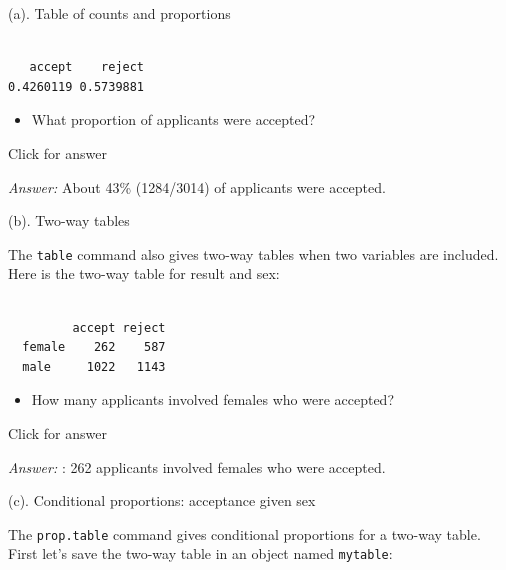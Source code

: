 \documentclass[
]{book}
\newenvironment{Shaded}{\begin{snugshade}}{\end{snugshade}}
\newcommand{\FunctionTok}[1]{\textcolor[rgb]{0.00,0.00,0.00}{#1}}
\newcommand{\NormalTok}[1]{#1}
\newcommand{\SpecialCharTok}[1]{\textcolor[rgb]{0.00,0.00,0.00}{#1}}
\providecommand{\tightlist}{%
  \setlength{\itemsep}{0pt}\setlength{\parskip}{0pt}}
\begin{document}
(a). Table of counts and proportions

\begin{Shaded}
\end{Shaded}

\begin{verbatim}

   accept    reject 
0.4260119 0.5739881 
\end{verbatim}

\begin{itemize}
\tightlist
\item
  What proportion of applicants were accepted?
\end{itemize}

Click for answer

\emph{Answer:} About 43\% (1284/3014) of applicants were accepted.

(b). Two-way tables

The \texttt{table} command also gives two-way tables when two variables are included. Here is the two-way table for result and sex:

\begin{Shaded}
\end{Shaded}

\begin{verbatim}
        
         accept reject
  female    262    587
  male     1022   1143
\end{verbatim}

\begin{itemize}
\tightlist
\item
  How many applicants involved females who were accepted?
\end{itemize}

Click for answer

\emph{Answer:} : 262 applicants involved females who were accepted.

(c). Conditional proportions: acceptance given sex

The \texttt{prop.table} command gives conditional proportions for a two-way table. First let's save the two-way table in an object named \texttt{mytable}:
\end{document}
